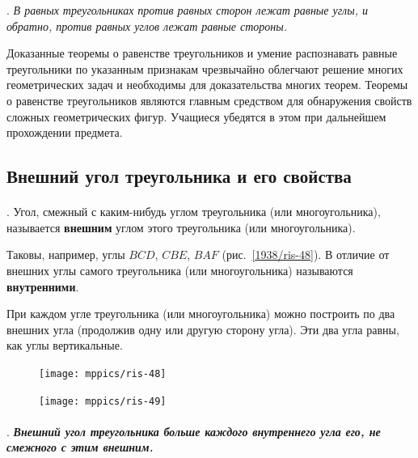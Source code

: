\documentclass[oneside]{book}
\makeatletter
\newcommand{\rindex}[2][\imki@jobname]{%
  \index[#1]{\detokenize{#2}}%
}
\makeatother
\begin{document}
\smallskip
\mbox{.}
\emph{В равных треугольниках против равных сторон лежат равные углы, и обратно, против равных углов лежат равные стороны.}

Доказанные теоремы о равенстве треугольников и умение распознавать равные треугольники по указанным признакам чрезвычайно облегчают решение многих геометрических задач и необходимы для доказательства многих теорем.
Теоремы о равенстве треугольников являются главным средством для обнаружения свойств сложных геометрических фигур.
Учащиеся убедятся в этом при дальнейшем прохождении предмета.

\subsection*{Внешний угол треугольника и его свойства}

\paragraph{}\label{1938/43}
\mbox{.}
Угол, смежный с каким-нибудь углом треугольника (или многоугольника), называется \rindex{внешний угол}\textbf{внешним} углом этого треугольника (или многоугольника). 

Таковы, например, углы $BCD$, $CBE$, $BAF$ (рис.~\ref{1938/ris-48}).
В отличие от внешних углы самого треугольника (или многоугольника) называются \rindex{внутренний угол}\textbf{внутренними}. 

При каждом угле треугольника (или многоугольника) можно построить по два внешних угла (продолжив одну или другую сторону угла).
Эти два угла равны, как углы вертикальные.

\begin{figure}[h!]
\begin{minipage}{.48\textwidth}
\centering
\texttt{[image: mppics/ris-48]}
\caption{}\label{1938/ris-48}
\end{minipage}\hfill
\begin{minipage}{.48\textwidth}
\centering
\texttt{[image: mppics/ris-49]}
\caption{}\label{1938/ris-49}
\end{minipage}
\end{figure}

\paragraph{}\label{1938/44}
\mbox{.}
\textbf{\emph{Внешний угол треугольника больше каждого внутреннего угла его, не смежного с этим внешним.}}
\end{document}
